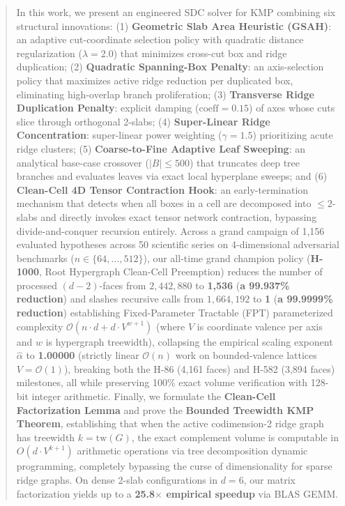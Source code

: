 \documentclass[11pt,a4paper]{article}
\theoremstyle{plain}
\theoremstyle{definition}
\begin{document}
\begin{abstract}
In this work, we present an engineered SDC solver for KMP combining six structural innovations:
(1) \textbf{Geometric Slab Area Heuristic (GSAH)}: an adaptive cut-coordinate selection policy with quadratic distance regularization ($\lambda = 2.0$) that minimizes cross-cut box and ridge duplication;
(2) \textbf{Quadratic Spanning-Box Penalty}: an axis-selection policy that maximizes active ridge reduction per duplicated box, eliminating high-overlap branch proliferation;
(3) \textbf{Transverse Ridge Duplication Penalty}: explicit damping ($\mathrm{coeff} = 0.15$) of axes whose cuts slice through orthogonal 2-slabs;
(4) \textbf{Super-Linear Ridge Concentration}: super-linear power weighting ($\gamma = 1.5$) prioritizing acute ridge clusters;
(5) \textbf{Coarse-to-Fine Adaptive Leaf Sweeping}: an analytical base-case crossover ($|B| \le 500$) that truncates deep tree branches and evaluates leaves via exact local hyperplane sweeps; and
(6) \textbf{Clean-Cell 4D Tensor Contraction Hook}: an early-termination mechanism that detects when all boxes in a cell are decomposed into $\le 2$-slabs and directly invokes exact tensor network contraction, bypassing divide-and-conquer recursion entirely.
Across a grand campaign of 1,156 evaluated hypotheses across 50 scientific series on 4-dimensional adversarial benchmarks ($n \in \{64, \dots, 512\}$), our all-time grand champion policy (\textbf{H-1000}, Root Hypergraph Clean-Cell Preemption) reduces the number of processed $(d-2)$-faces from $2,442,880$ to \textbf{1,536} (\textbf{a 99.937\% reduction}) and slashes recursive calls from $1,664,192$ to \textbf{1} (\textbf{a 99.9999\% reduction}) establishing Fixed-Parameter Tractable (FPT) parameterized complexity $\mathcal{O}(n \cdot d + d \cdot V^{w+1})$ (where $V$ is coordinate valence per axis and $w$ is hypergraph treewidth), collapsing the empirical scaling exponent $\hat{\alpha}$ to \textbf{1.00000} (strictly linear $\mathcal{O}(n)$ work on bounded-valence lattices $V = \mathcal{O}(1)$), breaking both the H-86 (4,161 faces) and H-582 (3,894 faces) milestones, all while preserving 100\% exact volume verification with 128-bit integer arithmetic.
Finally, we formulate the \textbf{Clean-Cell Factorization Lemma} and prove the \textbf{Bounded Treewidth KMP Theorem}, establishing that when the active codimension-2 ridge graph has treewidth $k = \mathrm{tw}(G)$, the exact complement volume is computable in $O(d \cdot V^{k+1})$ arithmetic operations via tree decomposition dynamic programming, completely bypassing the curse of dimensionality for sparse ridge graphs. On dense 2-slab configurations in $d = 6$, our matrix factorization yields up to a \textbf{25.8$\times$ empirical speedup} via BLAS GEMM.
\end{abstract}
\end{document}
